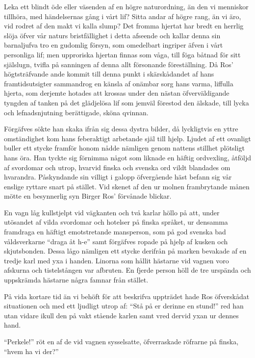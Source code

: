 Leka ett blindt öde eller väsenden af en högre naturordning, än den vi
menniskor tillhöra, med händelsernas gång i vårt lif? Sitta andar af
högre rang, än vi äro, vid rodret af den makt vi kalla slump? Det fromma
hjertat har bredt en herrlig slöja öfver vår naturs bristfällighet i
detta afseende och kallar denna sin barnaljufva tro en gudomlig försyn,
som omedelbart ingriper äfven i vårt personliga lif; men upproriska
hjertan finnas som våga, till föga båtnad för sitt själslugn, tvifla på
sanningen af denna allt försonande föreställning. Då Ros' högtsträfvande
ande kommit till denna punkt i skärskådandet af hans framtidsutsigter
sammandrog en känsla af onämbar sorg hans varma, liffulla hjerta, som
derjemte hotades att krossas under den nästan öfverväldigande tyngden af
tanken på det glädjelösa lif som jemväl förestod den älskade, till lycka
och lefnadsnjutning berättigade, sköna qvinnan.

Förgäfves sökte han skaka ifrån sig dessa dystra bilder, då lyckligtvis
en yttre omständighet kom hans feberaktigt arbetande själ till hjelp.
Ljudet af ett ovanligt buller ett stycke framför honom nådde nämligen
genom nattens stillhet plötsligt hans öra. Han tyckte sig förnimma något
som liknade en häftig ordvexling, åtföljd af svordomar och utrop,
hvarvid finska och svenska ord vildt blandades om hvarandra. Påskyndande
sin villigt i galopp öfvergående häst befann sig vår enslige ryttare
snart på stället. Vid skenet af den ur molnen frambrytande månen mötte
en besynnerlig syn Birger Ros' förvånade blickar.

En vagn låg kullstjelpt vid vägkanten och två karlar höllo på att, under
utösandet af vilda svordomar och hotelser på finska språket, ur densamma
framdraga en häftigt emotstretande mansperson, som på god svenska bad
våldsverkarne ``draga åt h-e'' samt förgäfves ropade på hjelp af kusken
och skjutsbonden. Dessa lågo nämligen ett stycke derifrån på marken
bevakade af en tredje karl med yxa i handen. Linorna som hållit hästarne
vid vagnen voro afskurna och tistelstången var afbruten. En fjerde
person höll de tre urspända och uppskrämda hästarne några famnar från
stället.

På vida kortare tid än vi behöft för att beskrifva uppträdet hade Ros
öfverskådat situationen och med ett ljudligt utrop af: ``Stå på er
derinne en stund!'' red han utan vidare ikull den på vakt stående karlen
samt vred dervid yxan ur dennes hand.

``Perkele!'' röt en af de vid vagnen sysselsatte, öfverraskade röfrarne
på finska, ``hvem ha vi der?''

